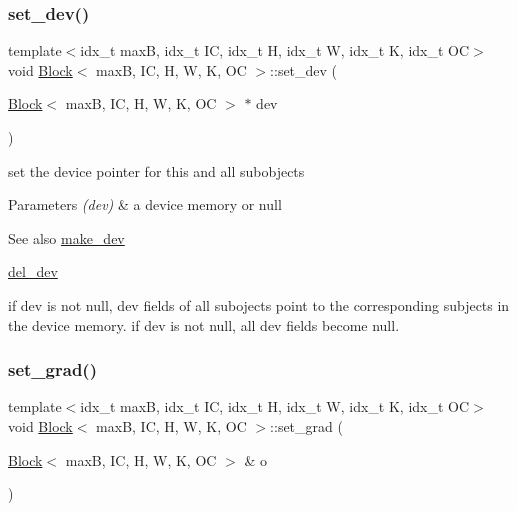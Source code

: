 \subsubsection{\texorpdfstring{set\+\_\+dev()}{set\_dev()}}
{\footnotesize\ttfamily template$<$idx\+\_\+t maxB, idx\+\_\+t IC, idx\+\_\+t H, idx\+\_\+t W, idx\+\_\+t K, idx\+\_\+t OC$>$ \\
void \hyperlink{structBlock}{Block}$<$ maxB, IC, H, W, K, OC $>$\+::set\+\_\+dev (\begin{DoxyParamCaption}\item[{\hyperlink{structBlock}{Block}$<$ maxB, IC, H, W, K, OC $>$ $\ast$}]{dev }\end{DoxyParamCaption})\hspace{0.3cm}{\ttfamily [inline]}}



set the device pointer for this and all subobjects 


\begin{DoxyParams}{Parameters}
{\em (dev)} & a device memory or null \\
\hline
\end{DoxyParams}
\begin{DoxySeeAlso}{See also}
\hyperlink{structBlock_a971798b11f5cdc883880c0be2f143908}{make\+\_\+dev} 

\hyperlink{structBlock_a46e9e4f4dcffddc409fa2b20263ea3b9}{del\+\_\+dev}
\end{DoxySeeAlso}
if dev is not null, dev fields of all subojects point to the corresponding subjects in the device memory. if dev is not null, all dev fields become null. \mbox{\label{structBlock_ae0db7335928b4b004b644f2ef3ac1bc0}} 
\subsubsection{\texorpdfstring{set\+\_\+grad()}{set\_grad()}}
{\footnotesize\ttfamily template$<$idx\+\_\+t maxB, idx\+\_\+t IC, idx\+\_\+t H, idx\+\_\+t W, idx\+\_\+t K, idx\+\_\+t OC$>$ \\
void \hyperlink{structBlock}{Block}$<$ maxB, IC, H, W, K, OC $>$\+::set\+\_\+grad (\begin{DoxyParamCaption}\item[{\hyperlink{structBlock}{Block}$<$ maxB, IC, H, W, K, OC $>$ \&}]{o }\end{DoxyParamCaption})\hspace{0.3cm}{\ttfamily [inline]}}



